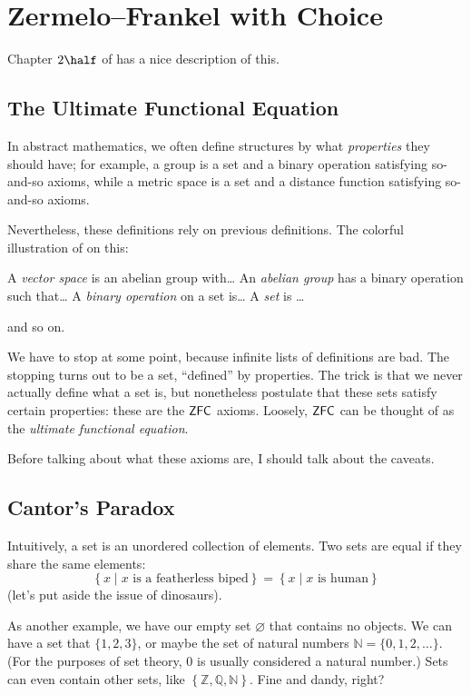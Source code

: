 \chapter{Zermelo--Frankel with Choice}
Chapter $2\half$ of \cite{ref:msci} has a nice description of this.

\section{The Ultimate Functional Equation}
In abstract mathematics, we often define structures by what \emph{properties}
they should have; for example, a group is a set and a binary operation
satisfying so-and-so axioms, while a metric space is a set and a distance function
satisfying so-and-so axioms.

Nevertheless, these definitions rely on previous definitions.
The colorful illustration of \cite{ref:msci} on this:
\begin{itemize}
	\ii A \emph{vector space} is an abelian group with\dots
	\ii An \emph{abelian group} has a binary operation such that\dots
	\ii A \emph{binary operation} on a set is\dots
	\ii A \emph{set} is \dots
\end{itemize}
and so on.

We have to stop at some point, because infinite lists of definitions are bad.
The stopping turns out to be a set, ``defined'' by properties.
The trick is that we never actually define what a set is,
but nonetheless postulate that these sets satisfy certain properties:
these are the $\mathsf{ZFC}$ axioms.
Loosely, $\mathsf{ZFC}$ can be thought of as the \emph{ultimate functional equation}.

Before talking about what these axioms are, I should talk about the caveats.

\section{Cantor's Paradox}
Intuitively, a set is an unordered collection of elements.
Two sets are equal if they share the same elements:
\[
	\left\{ x \mid x \text{ is a featherless biped} \right\}
	=
	\left\{ x \mid x \text{ is human} \right\}
\]
(let's put aside the issue of dinosaurs).

As another example, we have our empty set $\varnothing$ that contains no objects.
We can have a set that $\{1, 2, 3\}$, or maybe the set of natural numbers $\mathbb N = \{0, 1, 2, \dots \}$.  (For the purposes of set theory, $0$ is usually considered a natural number.)
Sets can even contain other sets, like $\left\{ \mathbb Z, \mathbb Q, \mathbb N \right\}$. Fine and dandy, right?


